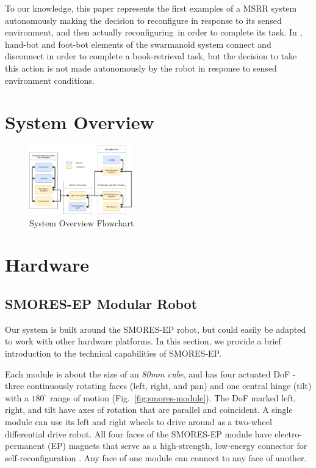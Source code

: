 \documentclass[conference]{IEEEtran}
\begin{document}
To our knowledge, this paper represents the first examples of a MSRR system autonomously making the decision to reconfigure in response to its sensed environment, and then actually reconfiguring\ in order to complete its task.  In \cite{Dorigo2013}, hand-bot and foot-bot elements of the swarmanoid system connect and disconnect in order to complete a book-retrieval task, but the decision to take this action is not made autonomously by the robot in response to sensed environment conditions.

\section{System Overview}
\begin{figure}
\begin{center}
\includegraphics[width=0.4\textwidth]{images/overview.png}
\caption{System Overview Flowchart}
\label{fig:overview}
\end{center}
\end{figure}


\section{Hardware} %
\label{sec:hardware}
%
\subsection{SMORES-EP Modular Robot} \label{sec:smores}
%
Our system is built around the SMORES-EP robot, but could easily be adapted to
work with other hardware platforms.  In this section, we provide a brief
introduction to the technical capabilities of SMORES-EP.

Each module is about the size of an \textit{80mm cube}, and has four actuated DoF - three continuously rotating faces (left, right, and
pan)  and one central hinge (tilt) with a \(180^\circ\) range of motion
(Fig.~\ref{fig:smores-module}). The DoF marked left, right, and tilt  have
 axes of rotation that are parallel and coincident. A single module can use its
left and right wheels to drive around as a two-wheel differential drive robot.
All four faces of the SMORES-EP module have electro-permanent (EP) magnets
that serve as a high-strength, low-energy connector for self-reconfiguration
\cite{tosun2016design}.  Any face of one module can connect to any face of
another.
\end{document}
